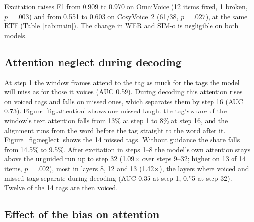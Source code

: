 \documentclass[11pt]{article}
\begin{document}
Excitation raises F1 from 0.909 to 0.970 on OmniVoice (12 items fixed, 1 broken, $p = .003$) and from 0.551 to 0.603 on CosyVoice~2 (61/38, $p = .027$), at the same RTF (Table~\ref{tab:main}). The change in WER and SIM-o is negligible on both models.

\subsection{Attention neglect during decoding}
\label{sec:neglect}

At step 1 the window frames attend to the tag as much for the tags the model will miss as for those it voices (AUC 0.59). During decoding this attention rises on voiced tags and falls on missed ones, which separates them by step 16 (AUC 0.73). Figure~\ref{fig:attention} shows one missed laugh: the tag's share of the window's text attention falls from 13\% at step 1 to 8\% at step 16, and the alignment runs from the word before the tag straight to the word after it. Figure~\ref{fig:neglect} shows the 14 missed tags. Without guidance the share falls from 14.5\% to 9.5\%. After excitation in steps 1--8 the model's own attention stays above the unguided run up to step 32 (1.09$\times$ over steps 9--32; higher on 13 of 14 items, $p = .002$), most in layers 8, 12 and 13 (1.42$\times$), the layers where voiced and missed tags separate during decoding (AUC 0.35 at step 1, 0.75 at step 32). Twelve of the 14 tags are then voiced.

\subsection{Effect of the bias on attention}

\begin{table}[t]
  \centering
  \footnotesize
  \caption{Median attention mass on the tag's tokens (mean over heads and layers) from the excited positions, without the bias (natural) and with it.}
  \label{tab:share}
\end{table}
\end{document}
